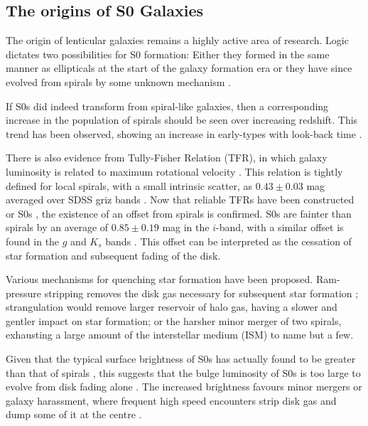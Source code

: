 \subsection{The origins of S0 Galaxies}
The origin of lenticular galaxies remains a highly active area of research. Logic dictates two possibilities for S0 formation: Either they formed in the same manner as ellipticals at the start of the galaxy formation era or they have since evolved from spirals by some unknown mechanism \citep{burstein_k-band_2005}.

If S0s did indeed transform from spiral-like galaxies, then a corresponding increase in the population of spirals should be seen over increasing redshift. This trend has been observed, showing an increase in early-types with look-back time \citep{dressler_evolution_1997}.

There is also evidence from Tully-Fisher Relation (TFR), in which galaxy luminosity is related to maximum rotational velocity \citep{tully_new_1977}. This relation is tightly defined for local spirals, with a small intrinsic scatter, as $0.43 \pm 0.03$ mag averaged over SDSS griz bands \citep{pizagno_tully-fisher_2007}. Now that reliable TFRs have been constructed or S0s \citep{bedregal_tullyfisher_2006}, the existence of an offset from spirals is confirmed. S0s are fainter than spirals by an average of $0.85 \pm 0.19$ mag in the $i$-band, with a similar offset is found in the $g$ and $K_s$ bands \citep{rawle_s0_2013}. This offset can be interpreted as the cessation of star formation and subsequent fading of the disk.

Various mechanisms for quenching star formation have been proposed. Ram-pressure stripping removes the disk gas necessary for subsequent star formation \citep{gunn_infall_1972}; strangulation would remove larger reservoir of halo gas, having a slower and gentler impact on star formation; or the harsher minor merger of two spirals, exhausting a large amount of the interstellar medium (ISM)  \citep{bekki_unequal-mass_1998} to name but a few.

Given that the typical surface brightness of S0s has actually found to be greater than that of spirals \citep{burstein_k-band_2005}, this suggests that the bulge luminosity of S0s is too large to evolve from disk fading alone \citep{cortesi_planetary_2013}. The increased brightness favours minor mergers or galaxy harassment, where frequent high speed encounters strip disk gas and dump some of it at the centre \citep{moore_galaxy_1996}.

